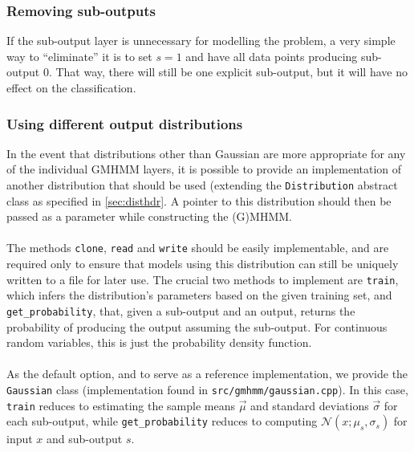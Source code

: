 \documentclass[12pt]{article}
\begin{document}
	\subsubsection{Removing sub-outputs}
	If the sub-output layer is unnecessary for modelling the problem, a very simple way to ``eliminate'' it is to set $s = 1$ and have all data points producing sub-output $0$. That way, there will still be one explicit sub-output, but it will have no effect on the classification.
	\subsubsection{Using different output distributions}\label{sec:difdist}
	In the event that distributions other than Gaussian are more appropriate for any of the individual GMHMM layers, it is possible to provide an implementation of another distribution that should be used (extending the {\tt Distribution} abstract class as specified in \cref{sec:disthdr}. A pointer to this distribution should then be passed as a parameter while constructing the (G)MHMM.\\ \\
	The methods {\tt clone}, {\tt read} and {\tt write} should be easily implementable, and are required only to ensure that models using this distribution can still be uniquely written to a file for later use. The crucial two methods to implement are {\tt train}, which infers the distribution's parameters based on the given training set, and {\tt get\_probability}, that, given a sub-output and an output, returns the probability of producing the output assuming the sub-output. For continuous random variables, this is just the probability density function.\\ \\
	As the default option, and to serve as a reference implementation, we provide the {\tt Gaussian} class (implementation found in {\tt src/gmhmm/gaussian.cpp}). In this case, {\tt train} reduces to estimating the sample means $\vec{\mu}$ and standard deviations $\vec{\sigma}$ for each sub-output, while {\tt get\_probability} reduces to computing $\mathcal{N}(x; \mu_s, \sigma_s)$ for input $x$ and sub-output $s$.
\end{document}
